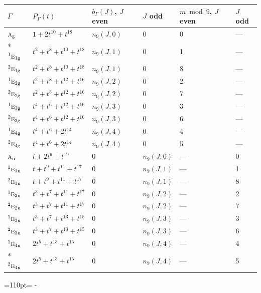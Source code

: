 \documentclass[10pt,a4paper]{article}
\newcommand{\needspace}[1]{\par\penalty-100\begingroup\dimen0=#1\relax\dimen2=\pagegoal
  \advance\dimen2-\pagetotal\ifdim\dimen0>\dimen2\relax\ifdim\dimen2>0pt\vfil\break\fi\fi
  \endgroup}
\numberwithin{equation}{section}
\newcommand{\irr}[1]{\text{\normalfont\scshape #1}}
\newcommand{\conjpair}[1]{{}^{#1}}
\newcommand{\ptag}[1]{\mathrm{#1}}
\begin{document}
{\small\begin{longtable}{@{}llllll@{}}\toprule
$\Gamma$ & $P_\Gamma(t)$ & $b_\Gamma(J)$, $J$ even & $J$ odd & $m \bmod 9$, $J$ even & $J$ odd\\\midrule\endhead
\bottomrule\endfoot\endlastfoot
$\irr{a}_{\ptag{g}}$ & $1 + 2t^{10} + t^{18}$ & $n_{9}(J,0)$ & $0$ & 0 & ---\\*
$\conjpair{1}\irr{e}_{1\ptag{g}}$ & $t^{2} + t^{8} + t^{10} + t^{18}$ & $n_{9}(J,1)$ & $0$ & 1 & ---\\
$\conjpair{2}\irr{e}_{1\ptag{g}}$ & $t^{2} + t^{8} + t^{10} + t^{18}$ & $n_{9}(J,1)$ & $0$ & 8 & ---\\
$\conjpair{1}\irr{e}_{2\ptag{g}}$ & $t^{2} + t^{8} + t^{12} + t^{16}$ & $n_{9}(J,2)$ & $0$ & 2 & ---\\
$\conjpair{2}\irr{e}_{2\ptag{g}}$ & $t^{2} + t^{8} + t^{12} + t^{16}$ & $n_{9}(J,2)$ & $0$ & 7 & ---\\
$\conjpair{1}\irr{e}_{3\ptag{g}}$ & $t^{4} + t^{6} + t^{12} + t^{16}$ & $n_{9}(J,3)$ & $0$ & 3 & ---\\
$\conjpair{2}\irr{e}_{3\ptag{g}}$ & $t^{4} + t^{6} + t^{12} + t^{16}$ & $n_{9}(J,3)$ & $0$ & 6 & ---\\
$\conjpair{1}\irr{e}_{4\ptag{g}}$ & $t^{4} + t^{6} + 2t^{14}$ & $n_{9}(J,4)$ & $0$ & 4 & ---\\
$\conjpair{2}\irr{e}_{4\ptag{g}}$ & $t^{4} + t^{6} + 2t^{14}$ & $n_{9}(J,4)$ & $0$ & 5 & ---\\
$\irr{a}_{\ptag{u}}$ & $t + 2t^{9} + t^{19}$ & $0$ & $n_{9}(J,0)$ & --- & 0\\
$\conjpair{1}\irr{e}_{1\ptag{u}}$ & $t + t^{9} + t^{11} + t^{17}$ & $0$ & $n_{9}(J,1)$ & --- & 1\\
$\conjpair{2}\irr{e}_{1\ptag{u}}$ & $t + t^{9} + t^{11} + t^{17}$ & $0$ & $n_{9}(J,1)$ & --- & 8\\
$\conjpair{1}\irr{e}_{2\ptag{u}}$ & $t^{3} + t^{7} + t^{11} + t^{17}$ & $0$ & $n_{9}(J,2)$ & --- & 2\\
$\conjpair{2}\irr{e}_{2\ptag{u}}$ & $t^{3} + t^{7} + t^{11} + t^{17}$ & $0$ & $n_{9}(J,2)$ & --- & 7\\
$\conjpair{1}\irr{e}_{3\ptag{u}}$ & $t^{3} + t^{7} + t^{13} + t^{15}$ & $0$ & $n_{9}(J,3)$ & --- & 3\\
$\conjpair{2}\irr{e}_{3\ptag{u}}$ & $t^{3} + t^{7} + t^{13} + t^{15}$ & $0$ & $n_{9}(J,3)$ & --- & 6\\
$\conjpair{1}\irr{e}_{4\ptag{u}}$ & $2t^{5} + t^{13} + t^{15}$ & $0$ & $n_{9}(J,4)$ & --- & 4\\*
$\conjpair{2}\irr{e}_{4\ptag{u}}$ & $2t^{5} + t^{13} + t^{15}$ & $0$ & $n_{9}(J,4)$ & --- & 5\\
\bottomrule\end{longtable}}
\needspace{110pt}
\end{document}
